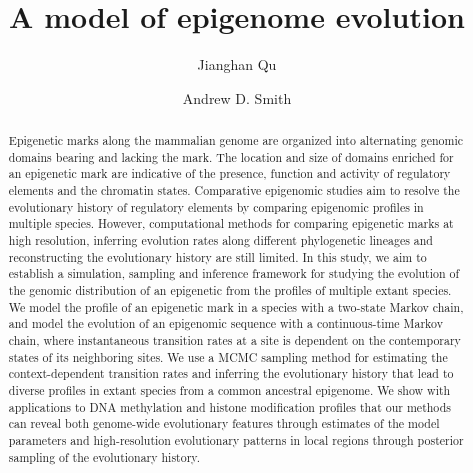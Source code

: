 \documentclass[11pt]{article}
\title{A model of epigenome evolution}
\author{Jianghan Qu \and Andrew D. Smith}
\begin{document}
\maketitle

\begin{abstract}
  Epigenetic marks along the mammalian genome are organized into
  alternating genomic domains bearing and lacking the mark. The
  location and size of domains enriched for an epigenetic mark are
  indicative of the presence, function and activity of regulatory
  elements and the chromatin states. Comparative epigenomic studies
  aim to resolve the evolutionary history of regulatory elements by
  comparing epigenomic profiles in multiple species.  However,
  computational methods for comparing epigenetic marks at high
  resolution, inferring evolution rates along different phylogenetic
  lineages and reconstructing the evolutionary history are still
  limited.  In this study, we aim to establish a simulation, sampling
  and inference framework for studying the evolution of the genomic
  distribution of an epigenetic from the profiles of multiple extant
  species.  We model the profile of an epigenetic mark in a species
  with a two-state Markov chain, and model the evolution of an
  epigenomic sequence with a continuous-time Markov chain, where
  instantaneous transition rates at a site is dependent on the
  contemporary states of its neighboring sites. We use a MCMC sampling
  method for estimating the context-dependent transition rates and
  inferring the evolutionary history that lead to diverse profiles in
  extant species from a common ancestral epigenome.  We show with
  applications to DNA methylation and histone modification profiles
  that our methods can reveal both genome-wide evolutionary features
  through estimates of the model parameters and high-resolution
  evolutionary patterns in local regions through posterior sampling of
  the evolutionary history.
\end{abstract}
\end{document}

